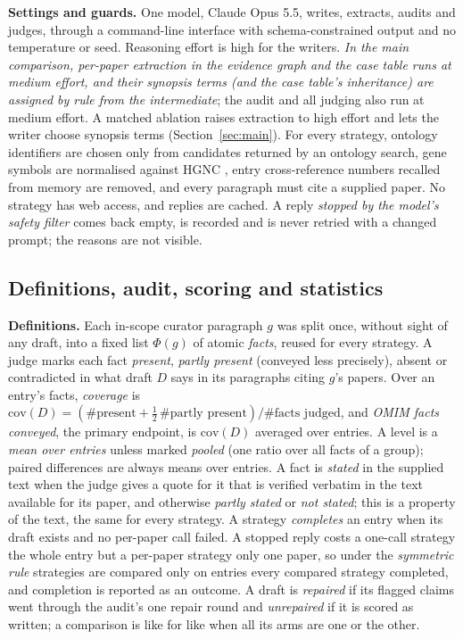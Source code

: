 \documentclass{article} %
\begin{document}
\textbf{Settings and guards.} One model, Claude Opus 5.5, writes, extracts, audits and judges, through a command-line interface with schema-constrained output and no temperature or seed. Reasoning effort is high for the writers. \emph{In the main comparison, per-paper extraction in the evidence graph and the case table runs at medium effort, and their synopsis terms (and the case table's inheritance) are assigned by rule from the intermediate}; the audit and all judging also run at medium effort. A matched ablation raises extraction to high effort and lets the writer choose synopsis terms (Section~\ref{sec:main}). For every strategy, ontology identifiers are chosen only from candidates returned by an ontology search, gene symbols are normalised against HGNC \citep{seal2023genenames}, entry cross-reference numbers recalled from memory are removed, and every paragraph must cite a supplied paper. No strategy has web access, and replies are cached. A reply \emph{stopped by the model's safety filter} comes back empty, is recorded and is never retried with a changed prompt; the reasons are not visible.

\subsection{Definitions, audit, scoring and statistics}
\label{sec:scoring}
\textbf{Definitions.} Each in-scope curator paragraph $g$ was split once, without sight of any draft, into a fixed list $\Phi(g)$ of atomic \emph{facts}, reused for every strategy. A judge marks each fact \emph{present}, \emph{partly present} (conveyed less precisely), absent or contradicted in what draft $D$ says in its paragraphs citing $g$'s papers. Over an entry's facts, \emph{coverage} is $\mathrm{cov}(D)=(\#\text{present}+\tfrac12\,\#\text{partly present})/\#\text{facts judged}$, and \emph{OMIM facts conveyed}, the primary endpoint, is $\mathrm{cov}(D)$ averaged over entries. A level is a \emph{mean over entries} unless marked \emph{pooled} (one ratio over all facts of a group); paired differences are always means over entries. A fact is \emph{stated} in the supplied text when the judge gives a quote for it that is verified verbatim in the text available for its paper, and otherwise \emph{partly stated} or \emph{not stated}; this is a property of the text, the same for every strategy. A strategy \emph{completes} an entry when its draft exists and no per-paper call failed. A stopped reply costs a one-call strategy the whole entry but a per-paper strategy only one paper, so under the \emph{symmetric rule} strategies are compared only on entries every compared strategy completed, and completion is reported as an outcome. A draft is \emph{repaired} if its flagged claims went through the audit's one repair round and \emph{unrepaired} if it is scored as written; a comparison is like for like when all its arms are one or the other.
\end{document}
